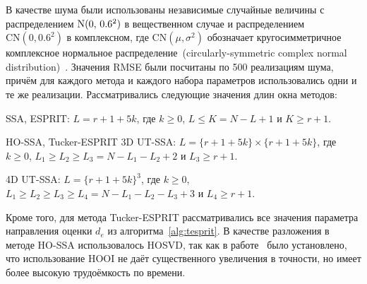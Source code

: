 \documentclass[specialist,
  substylefile = spbu.rtx,
subf,href,colorlinks=true, 12pt]{disser}
\theoremstyle{plain}
\theoremstyle{definition}
\theoremstyle{remark}
\def\newtssa/{UT-SSA}
\begin{document}
В качестве шума были использованы независимые случайные величины с
распределением $\mathrm{N}(0,\, 0.6^2)$ в вещественном случае и
распределением $\mathrm{CN}(0, 0.6^2)$ в комплексном, где
$\mathrm{CN}(\mu, \sigma^2)$ обозначает кругосимметричное комплексное
нормальное распределение~(cir\-cu\-lar\-ly-symmetric complex normal
distribution)~\cite{ComplexNormal}. Значения
RMSE были посчитаны по
500 реализациям шума, причём для каждого метода и каждого набора
параметров использовались одни и те же реализации.
Рассматривались следующие значения длин окна методов:
\begin{description}
  \item{SSA, ESPRIT}: $L = r + 1 + 5k$, где $k \geqslant 0$, $L \leqslant K =
    N - L + 1$ и $K \geqslant r + 1$.
  \item{HO-SSA, Tucker-ESPRIT 3D \newtssa/}: $L = \{r + 1 +
    5k\}\times\{r + 1 +
    5k\}$, где $k \geqslant 0$, $L_1 \geqslant L_2 \geqslant L_3 = N
    - L_1 - L_2 + 2$ и $L_3 \geqslant r + 1$.
  \item{4D \newtssa/}: $L = \{r + 1 + 5k\}^3$, где $k \geqslant 0$,
    $L_1 \geqslant L_2 \geqslant L_3 \geqslant L_4 = N - L_1 - L_2 -
    L_3 + 3$ и $L_4 \geqslant r + 1$.
\end{description}
Кроме того, для метода Tucker-ESPRIT рассматривались все значения параметра
направления оценки $d_e$ из алгоритма~\ref{alg:tesprit}.
В качестве разложения в методе HO-SSA использовалось HOSVD, так как в
работе~\cite{Thesis2024} было установлено, что использование HOOI не
даёт существенного увеличения в точности, но имеет более высокую
трудоёмкость по времени.
\end{document}
